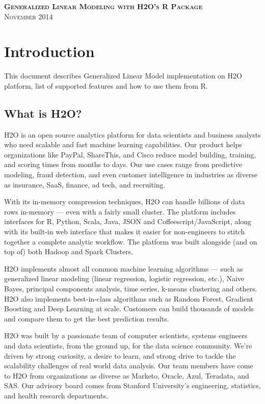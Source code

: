 \documentclass[11pt]{article}
\begin{document}
\thispagestyle{empty} %

\begin{center}
\textsc{\Large\bf{Generalized Linear Modeling  with H2O's R Package}}
\\
\bigskip
\textsc{November 2014}
\end{center}
\bigskip
\bigskip 
\bigskip
\bigskip
\tableofcontents

\newpage

\section{Introduction} \label{1}
This document describes Generalized Linear Model implementation on H2O platform, list of supported features and how to use them from R. 

\subsection{What is H2O?}
H2O is an open source analytics platform for data scientists and business analysts who need scalable and fast machine learning capabilities. Our product helps organizations like PayPal, ShareThis, and Cisco reduce model building, training, and scoring times from months to days. Our use cases range from predictive modeling, fraud detection, and even customer intelligence in industries as diverse as insurance, SaaS, finance, ad tech, and recruiting.

With its in-memory compression techniques, H2O can handle billions of data rows in-memory — even with a fairly small cluster. The platform includes interfaces for R, Python, Scala, Java, JSON and Coffeescript/JavaScript, along with its built-in web interface that makes it easier for non-engineers to stitch together a complete analytic workflow. The platform was built alongside (and on top of) both Hadoop and Spark Clusters.

H2O implements almost all common machine learning algorithms — such as generalized linear modeling (linear regression, logistic regression, etc.), Naive Bayes, principal components analysis, time series, k-means clustering and others. H2O also implements best-in-class algorithms such as Random Forest, Gradient Boosting and Deep Learning at scale. Customers can build thousands of models and compare them to get the best prediction results. 

H2O was built by a passionate team of computer scientists, systems engineers and data scientists, from the ground up, for the data science community. We’re driven by strong curiosity, a desire to learn, and strong drive to tackle the scalability challenges of real world data analysis. Our team members have come to H2O from organizations as diverse as Marketo, Oracle, Azul, Teradata, and SAS. Our advisory board comes from Stanford University’s engineering, statistics, and health research departments. 
\end{document}
